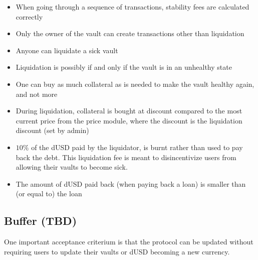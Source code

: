 \documentclass{article} %
\begin{document}
\begin{itemize}
  \item When going through a sequence of transactions, stability fees are
    calculated correctly
  \item Only the owner of the vault can create transactions other than
    liquidation
  \item Anyone can liquidate a sick vault
  \item Liquidation is possibly if and only if the vault is in an unhealthy
    state
  \item One can buy as much collateral as is needed to make the vault healthy
    again, and not more
  \item During liquidation, collateral is bought at discount compared to the
    most current price from the price module, where the discount is the
    liquidation discount (set by admin)
  \item $10\%$ of the dUSD paid by the liquidator, is burnt rather than used to
    pay back the debt. This liquidation fee is meant to disincentivize users
    from allowing their vaults to become sick.
  \item The amount of dUSD paid back (when paying back a loan) is smaller than
    (or equal to) the loan
\end{itemize}








\subsection{Buffer (TBD)}

One important acceptance criterium is that the protocol can be updated without
requiring users to update their vaults or dUSD becoming a new currency.
\end{document}

